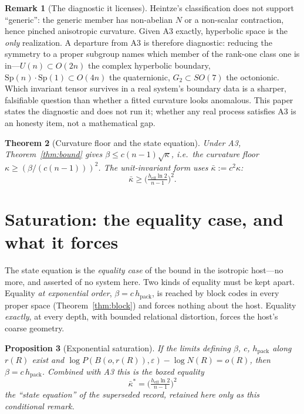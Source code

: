 \documentclass[11pt,reqno]{amsart}
\theoremstyle{plain}
\newtheorem{theorem}{Theorem}[section]
\newtheorem{proposition}[theorem]{Proposition}
\theoremstyle{definition}
\newtheorem{remark}[theorem]{Remark}
\newcommand{\hpack}{h_{\mathrm{pack}}}
\newcommand{\heff}{h_{\mathrm{eff}}}
\newcommand{\eps}{\varepsilon}
\begin{document}
\begin{remark}[The diagnostic it licenses]\label{rem:diagnostic}
Heintze's classification does not support ``generic'': the generic member has non-abelian $N$ or a non-scalar contraction, hence pinched anisotropic curvature. Given A3 exactly, hyperbolic space is the \emph{only} realization. A departure from A3 is therefore diagnostic: reducing the symmetry to a proper subgroup names which member of the rank-one class one is in---$U(n)\subset O(2n)$ the complex hyperbolic boundary, $\mathrm{Sp}(n)\!\cdot\!\mathrm{Sp}(1)\subset O(4n)$ the quaternionic, $G_2\subset SO(7)$ the octonionic. Which invariant tensor survives in a real system's boundary data is a sharper, falsifiable question than whether a fitted curvature looks anomalous. This paper states the diagnostic and does not run it; whether any real process satisfies A3 is an honesty item, not a mathematical gap.
\end{remark}

\begin{theorem}[Curvature floor and the state equation]\label{thm:floor}
Under A3, Theorem~\ref{thm:bound} gives $\beta\le c(n-1)\sqrt\kappa$, i.e.\ the curvature floor $\kappa\ge(\beta/(c(n-1)))^2$. The unit-invariant form uses $\bar\kappa:=c^2\kappa$:
\[
\bar\kappa\ge\Big(\tfrac{\heff\ln2}{n-1}\Big)^2.
\]
\end{theorem}

\section{Saturation: the equality case, and what it forces}\label{sec:IIb}

The state equation is the \emph{equality case} of the bound in the isotropic host---no more, and asserted of no system here. Two kinds of equality must be kept apart. Equality \emph{at exponential order}, $\beta=c\,\hpack$, is reached by block codes in every proper space (Theorem~\ref{thm:block}) and forces nothing about the host. Equality \emph{exactly}, at every depth, with bounded relational distortion, forces the host's coarse geometry.

\begin{proposition}[Exponential saturation]\label{prop:sat}
If the limits defining $\beta$, $c$, $\hpack$ along $r(R)$ exist and $\log P(B(o,r(R)),\eps)-\log N(R)=o(R)$, then $\beta=c\,\hpack$. Combined with A3 this is the boxed equality
\[
\boxed{\ \bar\kappa^*=\Big(\tfrac{\heff\ln2}{n-1}\Big)^2\ }
\]
the ``state equation'' of the superseded record, retained here only as this conditional remark.
\end{proposition}
\end{document}
